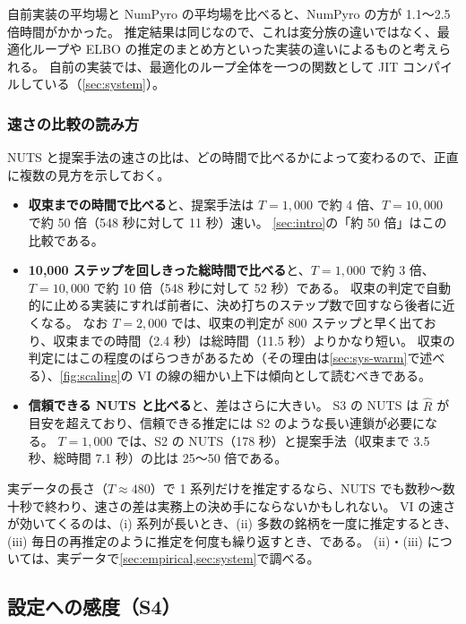 自前実装の平均場と NumPyro の平均場を比べると、NumPyro の方が 1.1〜2.5 倍時間がかかった。
推定結果は同じなので、これは変分族の違いではなく、最適化ループや ELBO の推定のまとめ方といった実装の違いによるものと考えられる。
自前の実装では、最適化のループ全体を一つの関数として JIT コンパイルしている（\cref{sec:system}）。

\subsubsection{速さの比較の読み方}

NUTS と提案手法の速さの比は、どの時間で比べるかによって変わるので、正直に複数の見方を示しておく。

\begin{itemize}
  \item \textbf{収束までの時間で比べる}と、提案手法は $T = 1{,}000$ で約 4 倍、$T = 10{,}000$ で約 50 倍（548 秒に対して 11 秒）速い。
    \cref{sec:intro}の「約 50 倍」はこの比較である。
  \item \textbf{10,000 ステップを回しきった総時間で比べる}と、$T = 1{,}000$ で約 3 倍、$T = 10{,}000$ で約 10 倍（548 秒に対して 52 秒）である。
    収束の判定で自動的に止める実装にすれば前者に、決め打ちのステップ数で回すなら後者に近くなる。
    なお $T = 2{,}000$ では、収束の判定が 800 ステップと早く出ており、収束までの時間（2.4 秒）は総時間（11.5 秒）よりかなり短い。
    収束の判定にはこの程度のばらつきがあるため（その理由は\cref{sec:sys-warm}で述べる）、\cref{fig:scaling}の VI の線の細かい上下は傾向として読むべきである。
  \item \textbf{信頼できる NUTS と比べる}と、差はさらに大きい。
    S3 の NUTS は $\hat R$ が目安を超えており、信頼できる推定には S2 のような長い連鎖が必要になる。
    $T = 1{,}000$ では、S2 の NUTS（178 秒）と提案手法（収束まで 3.5 秒、総時間 7.1 秒）の比は 25〜50 倍である。
\end{itemize}

実データの長さ（$T \approx 480$）で 1 系列だけを推定するなら、NUTS でも数秒〜数十秒で終わり、速さの差は実務上の決め手にならないかもしれない。
VI の速さが効いてくるのは、(i) 系列が長いとき、(ii) 多数の銘柄を一度に推定するとき、(iii) 毎日の再推定のように推定を何度も繰り返すとき、である。
(ii)・(iii) については、実データで\cref{sec:empirical,sec:system}で調べる。

\subsection{設定への感度（S4）}\label{sec:syn-sensitivity}

